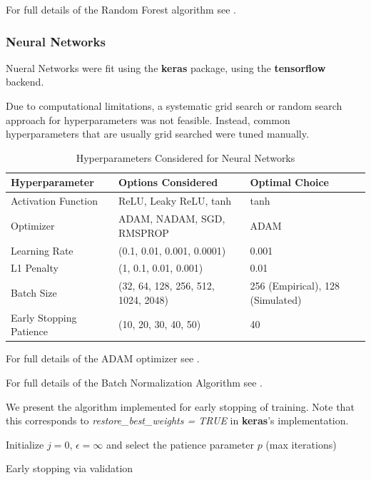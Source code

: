 \documentclass[11pt, a4paper, table]{article}
\begin{document}
For full details of the Random Forest algorithm see \cite{breiman_random_2001}. 

\subsubsection{Neural Networks}

Nueral Networks were fit using the \textbf{keras} package, using the \textbf{tensorflow} backend. 

Due to computational limitations, a systematic grid search or random search approach for hyperparameters was not feasible. Instead, common hyperparameters that are usually grid searched were tuned manually. 

\begin{table}
	\begin{tabular}{|lll|}
		\hline
		Hyperparameter & Options Considered & Optimal Choice \\ \hline
		Activation Function & ReLU, Leaky ReLU, tanh & tanh \\
		Optimizer & ADAM, NADAM, SGD, RMSPROP & ADAM \\
		Learning Rate & (0.1, 0.01, 0.001, 0.0001) & 0.001 \\
		L1 Penalty & (1, 0.1, 0.01, 0.001) & 0.01 \\
		Batch Size & (32, 64, 128, 256, 512, 1024, 2048) & 256 (Empirical), 128 (Simulated) \\
		Early Stopping Patience & (10, 20, 30, 40, 50) & 40 \\ \hline
	\end{tabular}
	\caption{Hyperparameters Considered for Neural Networks}
\end{table}

For full details of the ADAM optimizer see \cite{kingma_adam:_2014}.

For full details of the Batch Normalization Algorithm see \cite{ioffe_batch_2015}.

We present the algorithm implemented for early stopping of training. Note that this corresponds to \textit{restore\_best\_weights = TRUE} in \textbf{keras}'s implementation.

\begin{algorithm}
	\SetAlgoLined
	Initialize $j = 0$, $\epsilon = \infty$ and select the patience parameter $p$ (max iterations)\
	
	\caption{Early stopping via validation}
\end{algorithm}
\end{document}
